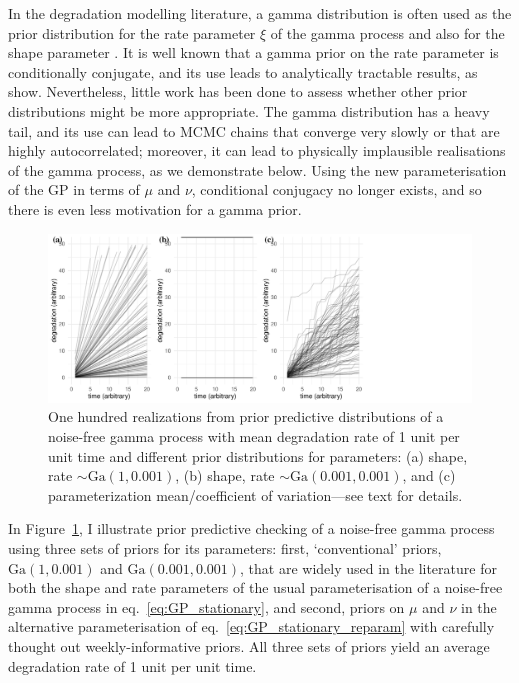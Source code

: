 In the degradation modelling literature, a gamma distribution is often used as the prior distribution for the rate parameter $\xi$ of the gamma process \citep{lawless2004} and also for the shape parameter \citep{rodriguez-picon2018}. It is well known that a gamma prior on the rate parameter is conditionally conjugate\citep{pradhan2011}, and its use leads to analytically tractable results, as \cite{lawless2004} show. Nevertheless, little work has been done to assess whether other prior distributions might be more appropriate. The gamma distribution has a heavy tail, and its use can lead to MCMC chains that converge very slowly or that are highly autocorrelated; moreover, it can lead to physically implausible realisations of the gamma process, as we demonstrate below. Using the new parameterisation of the GP in terms of $\mu$ and $\nu$, conditional conjugacy no longer exists, and so there is even less motivation for a gamma prior.

\begin{figure}
  \centering
  \includegraphics[width=1.2\textwidth]{./figures/ch-4/PPCs.pdf}
  \caption{One hundred realizations from prior predictive distributions of a noise-free gamma process with mean degradation rate of 1 unit per unit time and different prior distributions for parameters: (a) shape, rate $\sim \mbox{Ga}(1, 0.001)$, (b) shape, rate $\sim \mbox{Ga}(0.001, 0.001)$, and (c) parameterization mean/coefficient of variation---see text for details.}
  \label{fig:ppc}
\end{figure}

In Figure~\ref{fig:ppc}, I illustrate prior predictive checking of a noise-free gamma process using three sets of priors for its parameters: first, `conventional' priors, $\mbox{Ga}(1, 0.001)$ and $\mbox{Ga}(0.001, 0.001)$, that are widely used in the literature for both the shape and rate parameters of the usual parameterisation of a noise-free gamma process in eq.~\eqref{eq:GP_stationary}, and second, priors on $\mu$ and $\nu$ in the alternative parameterisation of eq.~\eqref{eq:GP_stationary_reparam} with carefully thought out weekly-informative priors. All three sets of priors yield an average degradation rate of 1 unit per unit time. 

